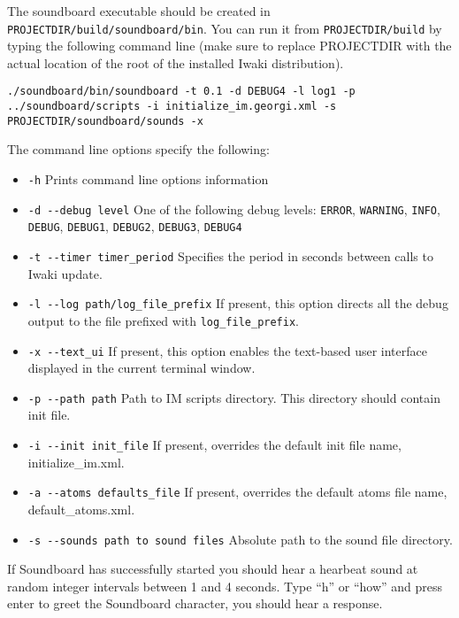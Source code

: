 The soundboard executable should be created in \texttt{PROJECTDIR/build/soundboard/bin}.
You can run it from \texttt{PROJECTDIR/build} by typing the following command line (make sure to replace PROJECTDIR with the actual location of the root of the installed Iwaki distribution).

\lstset{language=bash}
\begin{lstlisting}
./soundboard/bin/soundboard -t 0.1 -d DEBUG4 -l log1 -p ../soundboard/scripts -i initialize_im.georgi.xml -s PROJECTDIR/soundboard/sounds -x
\end{lstlisting}

The command line options specify the following:

\begin{itemize}
\item[] \texttt{-h} \hspace{2cm} Prints command line options information

\item[] \texttt{-d -{}-debug level} \hspace{2cm} One of the following debug levels: \texttt{ERROR}, \texttt{WARNING}, \texttt{INFO}, \texttt{DEBUG}, \texttt{DEBUG1}, \texttt{DEBUG2}, \texttt{DEBUG3}, \texttt{DEBUG4}

\item[] \texttt{-t -{}-timer timer\_period} \hspace{2cm} Specifies the period in seconds between calls to Iwaki update.

\item[] \texttt{-l -{}-log path/log\_file\_prefix} \hspace{2cm} If present, this option directs all the debug output to the file prefixed with \texttt{log\_file\_prefix}.

\item[] \texttt{-x -{}-text\_ui} \hspace{2cm} If present, this option enables the text-based user interface displayed in the current terminal window.

\item[] \texttt{-p -{}-path path} \hspace{2cm} Path to IM scripts directory. This directory should contain init file.

\item[] \texttt{-i -{}-init init\_file} \hspace{2cm} If present, overrides the default init file name, initialize\_im.xml. 

\item[] \texttt{-a -{}-atoms defaults\_file} \hspace{2cm} If present, overrides the default atoms file name, default\_atoms.xml. 

\item[] \texttt{-s -{}-sounds path to sound files} \hspace{2cm} Absolute path to the sound file directory.

\end{itemize}


If Soundboard has successfully started you should hear a hearbeat sound at random integer intervals between 1 and 4 seconds. Type ``h'' or ``how'' and press enter to greet the Soundboard character, you should hear a response.

